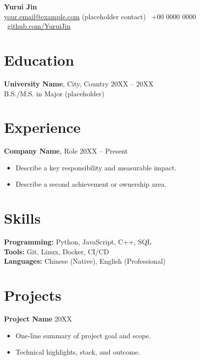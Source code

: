 \documentclass[11pt,a4paper]{article}
\begin{document}
{\LARGE \textbf{Yurui Jin}}\\
\href{mailto:your.email@example.com}{your.email@example.com}
(placeholder contact) \textbar\
+00 0000 0000 \textbar\
\href{https://github.com/YuruiJin}{github.com/YuruiJin}

\section*{Education}
\textbf{University Name}, City, Country \hfill 20XX -- 20XX\\
B.S./M.S. in Major (placeholder)

\section*{Experience}
\textbf{Company Name}, Role \hfill 20XX -- Present
\begin{itemize}
  \item Describe a key responsibility and measurable impact.
  \item Describe a second achievement or ownership area.
\end{itemize}

\section*{Skills}
\textbf{Programming:} Python, JavaScript, C++, SQL\\
\textbf{Tools:} Git, Linux, Docker, CI/CD\\
\textbf{Languages:} Chinese (Native), English (Professional)

\section*{Projects}
\textbf{Project Name} \hfill 20XX
\begin{itemize}
  \item One-line summary of project goal and scope.
  \item Technical highlights, stack, and outcome.
\end{itemize}
\end{document}
